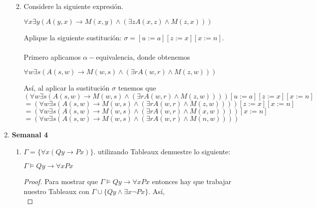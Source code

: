 \documentclass[letterpaper,12pt]{article}
\begin{document}
\begin{enumerate}
\begin{enumerate}
        \newpage
        \item Considere la siguiente expresión.

        \begin{center}
            $\forall x \exists y (A(y,x) \rightarrow M(x,y) \land 
            (\exists z A(x,z) \land M(z,x)))$
        \end{center}

        Aplique la siguiente sustitución: $\sigma = [u := a][z := x][x := n]$.\\ \\
         Primero aplicamos $\alpha-$equivalencia, donde 
        obtenemos 

        \begin{center}
            $\forall w \exists s (A(s,w) \rightarrow M(w,s) \land 
            (\exists r A(w,r) \land M(z,w)))$
        \end{center}

        Así, al aplicar la sustitución $\sigma$ tenemos que \\
        $(\forall w \exists s (A(s,w) \rightarrow M(w,s) \land 
        (\exists r A(w,r) \land M(z,w))))[u := a][z := x][x := n]$ \\  
        $= (\forall w \exists s (A(s,w) \rightarrow M(w,s) \land 
        (\exists r A(w,r) \land M(z,w))))[z := x][x := n]$ \\
        $ = (\forall w \exists s (A(s,w) \rightarrow M(w,s) \land 
        (\exists r A(w,r) \land M(x,w))))[x := n]$ \\
        $ = (\forall w \exists s (A(s,w) \rightarrow M(w,s) \land 
        (\exists r A(w,r) \land M(n,w))))$ 
    \end{enumerate}

    \item \textbf{Semanal 4}
    
    \begin{enumerate}
        \item $\Gamma = \{ \forall x (Qy \rightarrow Px)\}$. utilizando Tableaux
        demuestre lo siguiente: 

        \begin{center}
            $\Gamma \models Qy \rightarrow \forall x Px$
        \end{center}

        \begin{proof}
            Para mostrar que $\Gamma \models Qy \rightarrow \forall x Px$ 
            entonces hay que trabajar nuestro Tableaux con 
            $\Gamma \cup \{Qy \land \exists x \neg Px\}$. Así, \\ 


\end{proof}
\end{enumerate}
\end{enumerate}
\end{document}
